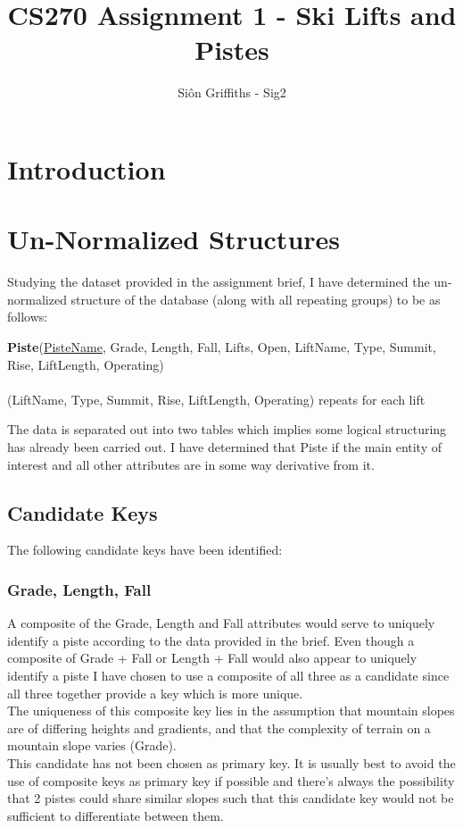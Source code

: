 \documentclass[titlepage ,12pt]{article}
\title{CS270 Assignment 1 - Ski Lifts and Pistes}
\author{Si\^{o}n Griffiths - Sig2}
\begin{document}
\maketitle
\newpage
\tableofcontents
\clearpage


\section{Introduction}

\section{Un-Normalized Structures}

Studying the dataset provided in the assignment brief, I have determined the un-normalized structure of the database (along with all repeating groups) to be as follows:
 
\textbf{Piste}(\underline{PisteName}, Grade, Length, Fall, Lifts, Open, LiftName, Type, Summit, Rise, LiftLength, Operating) \\ \\
(LiftName, Type, Summit, Rise, LiftLength, Operating) repeats for each lift
 \newline

The data is separated out into two tables which implies some logical structuring has already been carried out. I have determined that Piste if the main entity of interest and all other attributes are in some way derivative from it. 

\subsection{Candidate Keys}
The following candidate keys have been identified: 

\subsubsection{Grade, Length, Fall}

A composite of the Grade, Length and Fall attributes would serve to uniquely identify a piste according to the data provided in the brief. Even though a composite of Grade + Fall or Length + Fall would also appear to uniquely identify a piste I have chosen to use a composite of all three as a candidate since all three together provide a key which is more unique. \\
The uniqueness of this composite key lies in the assumption that mountain slopes are of differing heights and gradients, and that the complexity of terrain on a mountain slope varies (Grade). \\
This candidate has not been chosen as primary key. It is usually best to avoid the use of composite keys as primary key if possible and there's always the possibility that 2 pistes could share similar slopes such that this candidate key would not be sufficient to differentiate between them.
\end{document}
